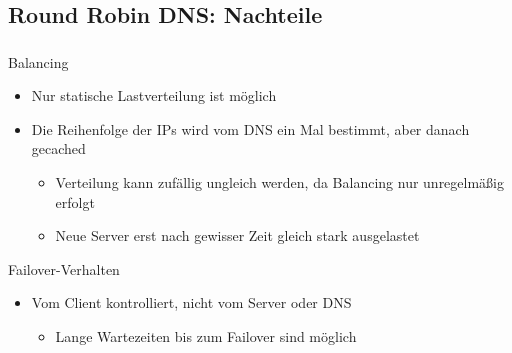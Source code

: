 \subsection{Round Robin DNS: Nachteile}
\begin{frame}
    \frametitle{\insertsection}
    \framesubtitle{\insertsubsection}

    \begin{block}{Balancing}
	    \begin{itemize}
	    	\item Nur statische Lastverteilung ist möglich
	    	\item Die Reihenfolge der IPs wird vom DNS ein Mal bestimmt, aber danach gecached
	    	\begin{itemize}
	    		\item Verteilung kann zufällig ungleich werden, da Balancing nur unregelmäßig erfolgt
	    		\item Neue Server erst nach gewisser Zeit gleich stark ausgelastet
	    	\end{itemize}
	    \end{itemize}
    \end{block}

    \begin{block}{Failover-Verhalten}
	    \begin{itemize}
	    	\item Vom Client kontrolliert, nicht vom Server oder DNS
	    	\begin{itemize}
	    		\item Lange Wartezeiten bis zum Failover sind möglich
	    	\end{itemize}
	    \end{itemize}
    \end{block}
\end{frame}

